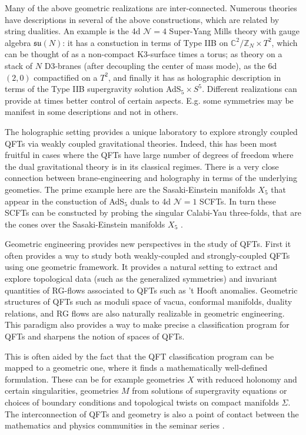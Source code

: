 \documentclass[12pt]{article}
\begin{document}
Many of the above geometric realizations are inter-connected. Numerous theories have descriptions in several of the above constructions, which are related by string dualities. An example is the 4d $\mathcal{N}=4$ Super-Yang Mills theory with gauge algebra $\mathfrak{su}(N)$: 
it has a constuction in terms of Type IIB on  $\mathbb{C}^2/\mathbb{Z}_N \times T^2$, which can be thought of as a non-compact K3-surface times a torus; as theory on a stack of $N$ D3-branes (after decoupling the center of mass mode), as the 6d $(2,0)$ compactified on a $T^2$, and finally it has as holographic description in terms of the Type IIB supergravity solution AdS$_5\times S^5$. Different realizations can provide at times better control of certain aspects. E.g. some symmetries may be  manifest in some descriptions and not in others. 


The holographic setting provides a unique laboratory to explore strongly coupled QFTs via weakly coupled gravitational theories.  Indeed, this has been most fruitful in cases where the QFTs have large number of degrees of freedom where the dual gravitational theory is in its classical regimes.  There is a very close connection between brane-engineering and holography in terms of the underlying geometies. The prime example here are the Sasaki-Einstein manifolds $X_5$ that appear in the constuction of AdS$_5$ duals to 4d $\mathcal{N}=1$ SCFTs. In turn these SCFTs can be constucted by probing the singular Calabi-Yau three-folds, that are the cones over the Sasaki-Einstein manifolds $X_5$ \cite{Gauntlett:2005ww}. 




Geometric engineering provides new perspectives in the study of QFTs.  First it often provides a way to study both  weakly-coupled and strongly-coupled QFTs using one geometric framework. 
It provides a natural setting to extract and explore topological data (such as the generalized symmetries) and invariant quantities of RG-flows associated to QFTs  such as 't Hooft anomalies. Geometric structures of QFTs such as moduli space of vacua, conformal manifolds, duality relations, and RG flows are also naturally realizable in geometric engineering.  This paradigm also provides a way to make precise a classification program for QFTs and sharpens the notion of spaces of QFTs. 

This is often aided by the fact that the QFT classification program can be mapped to a geometric one, where it finds a mathematically well-defined formulation. 
 These can be for example geometries $X$ with reduced holonomy and certain singularities, geometries $M$ from solutions of supergravity equations or choices of boundary conditions and topological twists on compact manifolds $\Sigma$.  The interconnection of QFTs and geometry is also a point of contact between the mathematics and physics communities in the seminar series \cite{QFTandGeo}. 
\end{document}
